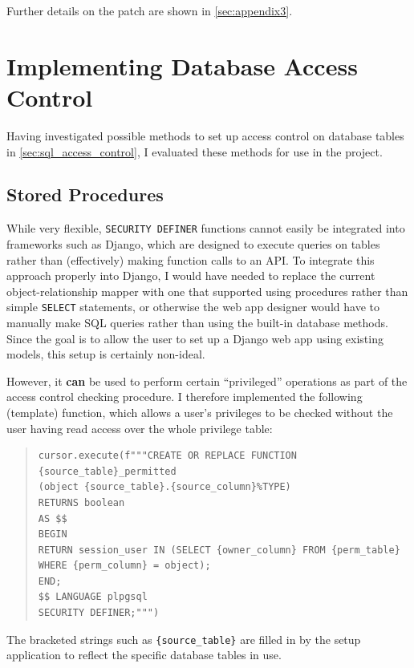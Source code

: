 \documentclass[12pt]{report}
\begin{document}
Further details on the patch are shown in \autoref{sec:appendix3}.

\section{Implementing Database Access Control}
\label{sec:implementing_database_access_control}
Having investigated possible methods to set up access control on database tables in \autoref{sec:sql_access_control}, I evaluated these methods for use in the project.

\subsection{Stored Procedures}
While very flexible, \texttt{SECURITY DEFINER} functions cannot easily be integrated into frameworks such as Django, which are designed to execute queries on tables rather than (effectively) making function calls to an API. To integrate this approach properly into Django, I would have needed to replace the current object-relationship mapper with one that supported using procedures rather than simple \texttt{SELECT} statements, or otherwise the web app designer would have to manually make SQL queries rather than using the built-in database methods. Since the goal is to allow the user to set up a Django web app using existing models, this setup is certainly non-ideal.

However, it \textbf{can} be used to perform certain ``privileged'' operations as part of the access control checking procedure. I therefore implemented the following (template) function, which allows a user's privileges to be checked without the user having read access over the whole privilege table:

\begin{quote}
\begin{samepage}
\begin{verbatim}
cursor.execute(f"""CREATE OR REPLACE FUNCTION {source_table}_permitted
(object {source_table}.{source_column}%TYPE)
RETURNS boolean
AS $$
BEGIN
RETURN session_user IN (SELECT {owner_column} FROM {perm_table}
WHERE {perm_column} = object);
END;
$$ LANGUAGE plpgsql
SECURITY DEFINER;""")
\end{verbatim}
\end{samepage}
\end{quote}

The bracketed strings such as \verb+{source_table}+ are filled in by the setup application to reflect the specific database tables in use.
\end{document}
